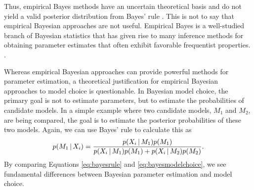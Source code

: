 Thus, empirical Bayes methods have an uncertain theoretical basis and
do not yield a valid posterior distribution from Bayes' rule \citep[e.g.,
empirical Bayesian estimates of the posterior are often too narrow, off-center,
and incorrectly shaped;][]{Morris1983,Laird1987,Carlin1990,Efron2013}.
This is not to say that empirical Bayesian approaches are not useful.
Empirical Bayes is a well-studied branch of Bayesian statistics that has given
rise to many inference methods for obtaining parameter estimates that often
exhibit favorable frequentist properties.
\citep{Morris1983,Laird1987,Laird1989, Carlin1990,Hwang2009}.

\begin{linenomath}
Whereas empirical Bayesian approaches can provide powerful methods for
parameter estimation, a theoretical justification for empirical Bayesian
approaches to model choice is questionable.
In Bayesian model choice, the primary goal is not to estimate parameters, but
to estimate the probabilities of candidate models.
In a simple example where two candidate models, $M_1$ and $M_2$, are being
compared, the goal is to estimate the posterior probabilities of these two
models.
Again, we can use Bayes' rule to calculate this as
\begin{equation}
    p(M_1 \given \alignment{i}{}) = \frac{p(\alignment{i}{} \given
    M_1)p(M_1)}{p(\alignment{i}{} \given M_1)p(M_1) + p(\alignment{i}{} \given
    M_2)p(M_2)}.
    \label{eq:bayesmodelchoice}
\end{equation}
By comparing Equations \ref{eq:bayesrule} and \ref{eq:bayesmodelchoice}, we
see fundamental differences between Bayesian parameter estimation and
model choice.
\end{linenomath}


